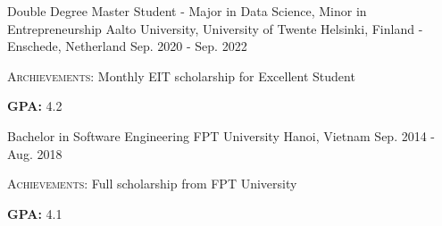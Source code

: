 \begin{cventries}
  \cventry
  {Double Degree Master Student - Major in Data Science, Minor in Entrepreneurship}
  {Aalto University, University of Twente}
  {Helsinki, Finland - Enschede, Netherland}
  {Sep. 2020 - Sep. 2022}
  {
    \begin{cvitems}
      \item {\fontsize{10pt}{1em}\bodyfont\scshape\color{graytext} Archievements:} {Monthly EIT scholarship for Excellent Student}
      \item \textbf{GPA: } 4.2
    \end{cvitems}
  }
  
  
  \cventry
    {Bachelor in Software Engineering} %
    {FPT University} %
    {Hanoi, Vietnam} %
    {Sep. 2014 - Aug. 2018} %
    {
      \begin{cvitems} %
        \item {\fontsize{10pt}{1em}\bodyfont\scshape\color{graytext} Achievements: }{Full scholarship from FPT University}
        \item \textbf{GPA: } 4.1
      \end{cvitems}
    }

\end{cventries}
